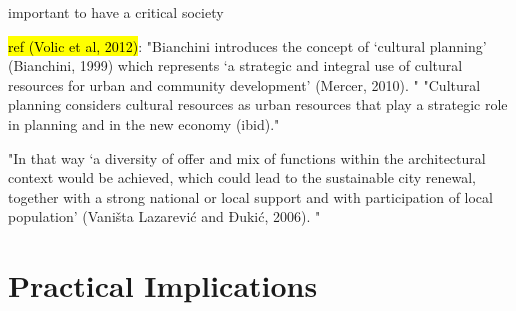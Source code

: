 \documentclass[11pt]{report}
\begin{document}
important to have a critical society

\hl{ref (Volic et al, 2012)}:
"Bianchini introduces the concept of ‘cultural planning’ (Bianchini, 1999) which represents ‘a strategic and integral use of cultural  resources  for  urban  and  community development’ (Mercer, 2010). "
"Cultural  planning considers cultural resources as urban resources that play a strategic role in planning and in the
new economy (ibid)."

"In that way ‘a diversity of offer and mix of functions within the architectural context would be achieved, which could  lead  to  the  sustainable  city  renewal, together with a strong national or local support and  with  participation  of  local  population’ (Vaništa Lazarević and Đukić, 2006). "

\section{Practical Implications}
\end{document}
